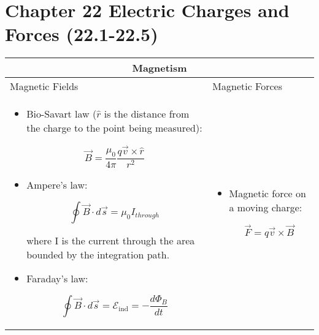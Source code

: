 \documentclass{article}
\begin{document}
\LARGE

\section*{Chapter 22 Electric Charges and Forces (22.1-22.5)}
\normalsize
\begin{center}

	\begin{longtable}{|p{9cm}|p{9cm}|}

		\hline

		\multicolumn{2}{|c|}{Magnetism}                                                                           \\

		\hline



		Magnetic Fields & Magnetic Forces                                                                         \\



		\begin{itemize}

			\item Bio-Savart law ($ \hat{r}$ is the distance from the charge to the point being measured):

			      \[ \vec{B} = \frac{\mu_0}{4\pi} \frac{q\vec{v} \times \hat{r}}{r^2} \]

			\item Ampere's law:

			      \[ \oint \vec{B} \cdot d \vec{s} = \mu_0 I_{through} \]

			      where I is the current through the area bounded by the integration path.



			\item Faraday's law:



			      \[ \oint \vec B \cdot d \vec s = \mathcal{E}_\text{ind} = - \frac{d \Phi_B}{dt} \]

		\end{itemize}



		                &



		\begin{itemize}

			\item Magnetic force on a moving charge:

			      \[ \vec{F} = q\vec{v} \times \vec{B} \]


\end{itemize}
\end{longtable}
\end{center}
\end{document}
